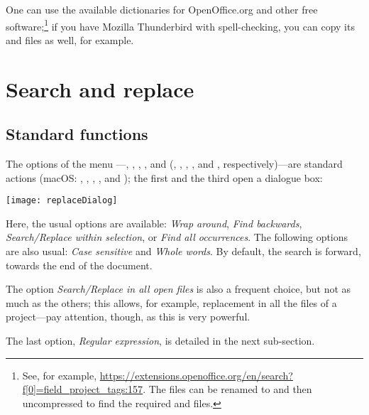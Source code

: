 One can use the available dictionaries for OpenOffice.org and other free software;\footnote{See, for example, \url{https://extensions.openoffice.org/en/search?f[0]=field_project_tags:157}. The  files can be renamed to  and then uncompressed to find the required  and  files.} if you have Mozilla Thunderbird with spell-checking, you can copy its  and  files as well, for example.

\section{Search and replace}

\subsection{Standard functions}

The options of the menu ---, , , , and  (, , , , and , respectively)---are standard actions (macOS: , , , , and ); the first and the third open a dialogue box:

\begin{center}
\texttt{[image: replaceDialog]}
\end{center}

Here, the usual options are available: \emph{Wrap around}, \emph{Find backwards}, \emph{Search/Replace within selection}, or \emph{Find all occurrences}. The following options are also usual: \emph{Case sensitive} and \emph{Whole words}. By default, the search is forward, towards the end of the document.

The option \emph{Search/Replace in all open files} is also a frequent choice, but not as much as the others; this allows, for example, replacement in all the files of a project---pay attention, though, as this is very powerful.

The last option, \emph{Regular expression}, is detailed in the next sub-section.

